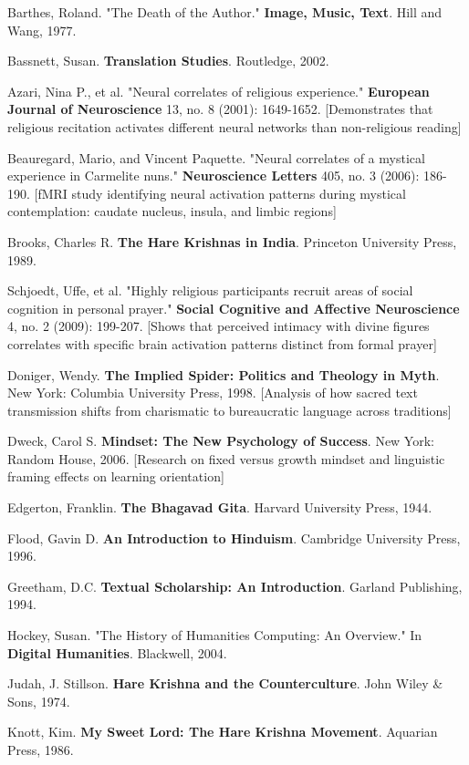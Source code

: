\documentclass[12pt,twoside]{book}
\begin{document}
Barthes, Roland. "The Death of the Author." \textbf{Image, Music, Text}. Hill and Wang, 1977.

Bassnett, Susan. \textbf{Translation Studies}. Routledge, 2002.

Azari, Nina P., et al. "Neural correlates of religious experience." \textbf{European Journal of Neuroscience} 13, no. 8 (2001): 1649-1652. [Demonstrates that religious recitation activates different neural networks than non-religious reading]

Beauregard, Mario, and Vincent Paquette. "Neural correlates of a mystical experience in Carmelite nuns." \textbf{Neuroscience Letters} 405, no. 3 (2006): 186-190. [fMRI study identifying neural activation patterns during mystical contemplation: caudate nucleus, insula, and limbic regions]

Brooks, Charles R. \textbf{The Hare Krishnas in India}. Princeton University Press, 1989.

Schjoedt, Uffe, et al. "Highly religious participants recruit areas of social cognition in personal prayer." \textbf{Social Cognitive and Affective Neuroscience} 4, no. 2 (2009): 199-207. [Shows that perceived intimacy with divine figures correlates with specific brain activation patterns distinct from formal prayer]

Doniger, Wendy. \textbf{The Implied Spider: Politics and Theology in Myth}. New York: Columbia University Press, 1998. [Analysis of how sacred text transmission shifts from charismatic to bureaucratic language across traditions]

Dweck, Carol S. \textbf{Mindset: The New Psychology of Success}. New York: Random House, 2006. [Research on fixed versus growth mindset and linguistic framing effects on learning orientation]

Edgerton, Franklin. \textbf{The Bhagavad Gita}. Harvard University Press, 1944.

Flood, Gavin D. \textbf{An Introduction to Hinduism}. Cambridge University Press, 1996.

Greetham, D.C. \textbf{Textual Scholarship: An Introduction}. Garland Publishing, 1994.

Hockey, Susan. "The History of Humanities Computing: An Overview." In \textbf{Digital Humanities}. Blackwell, 2004.

Judah, J. Stillson. \textbf{Hare Krishna and the Counterculture}. John Wiley \& Sons, 1974.

Knott, Kim. \textbf{My Sweet Lord: The Hare Krishna Movement}. Aquarian Press, 1986.
\end{document}
